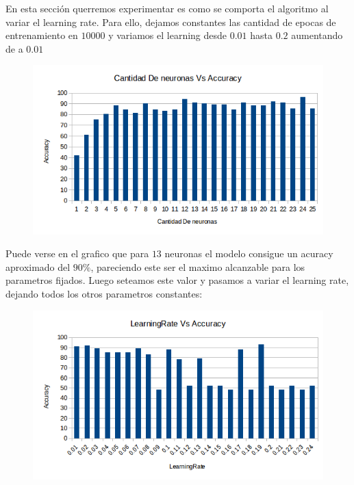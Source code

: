 \reescribir 

En esta sección querremos experimentar es como se comporta el algoritmo al variar el learning rate. Para ello, dejamos constantes las cantidad de epocas de entrenamiento en $10000$ y variamos el learning desde $0.01$ hasta $0.2$ aumentando de a $0.01$

\begin{figure}[h!]
  \centering
    \includegraphics[scale=0.4]{ej1/cantNeuronasVsAccuracy.png}
\end{figure}

Puede verse en el grafico que para $13$ neuronas el modelo consigue un acuracy aproximado del $90\%$, pareciendo este ser el maximo alcanzable para los parametros fijados. Luego seteamos este valor y pasamos a variar el learning rate, dejando todos los otros parametros constantes:

\begin{figure}[h!]
  \centering
    \includegraphics[scale=0.4]{ej1/learningRate.png}
\end{figure}

